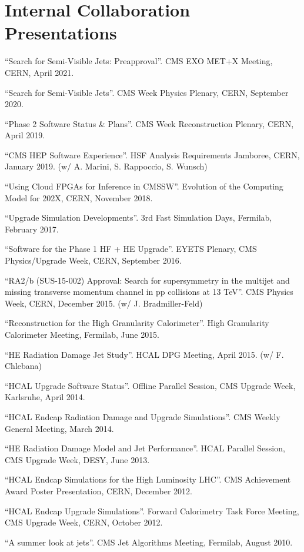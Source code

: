 \ifdefined\longflag
\section{Internal Collaboration Presentations}
\begin{description}[leftmargin=12pt,font=\normalfont,labelsep=0em]
\item ``Search for Semi-Visible Jets: Preapproval''. CMS EXO MET+X Meeting, CERN, April 2021.
\item ``Search for Semi-Visible Jets''. CMS Week Physics Plenary, CERN, September 2020.
\item ``Phase 2 Software Status \& Plans''. CMS Week Reconstruction Plenary, CERN, April 2019.
\item ``CMS HEP Software Experience''. HSF Analysis Requirements Jamboree, CERN, January 2019. (w/ A. Marini, S. Rappoccio, S. Wunsch)
\item ``Using Cloud FPGAs for Inference in CMSSW''. Evolution of the Computing Model for 202X, CERN, November 2018.
\item ``Upgrade Simulation Developments''. 3rd Fast Simulation Days, Fermilab, February 2017.
\item ``Software for the Phase 1 HF + HE Upgrade''. EYETS Plenary, CMS Physics/Upgrade Week, CERN, September 2016.
\item ``RA2/b (SUS-15-002) Approval: Search for supersymmetry in the multijet and missing transverse momentum channel in pp collisions at 13 TeV''. CMS Physics Week, CERN, December 2015. (w/ J. Bradmiller-Feld)
\item ``Reconstruction for the High Granularity Calorimeter''. High Granularity Calorimeter Meeting, Fermilab, June 2015.
\item ``HE Radiation Damage Jet Study''. HCAL DPG Meeting, April 2015. (w/ F. Chlebana)
\item ``HCAL Upgrade Software Status''. Offline Parallel Session, CMS Upgrade Week, Karlsruhe, April 2014.
\item ``HCAL Endcap Radiation Damage and Upgrade Simulations''. CMS Weekly General Meeting, March 2014.
\item ``HE Radiation Damage Model and Jet Performance''. HCAL Parallel Session, CMS Upgrade Week, DESY, June 2013.
\item ``HCAL Endcap Simulations for the High Luminosity LHC''. CMS Achievement Award Poster Presentation, CERN, December 2012.
\item ``HCAL Endcap Upgrade Simulations''. Forward Calorimetry Task Force Meeting, CMS Upgrade Week, CERN, October 2012.
\item ``A summer look at jets''. CMS Jet Algorithms Meeting, Fermilab, August 2010.
\end{description}
\fi